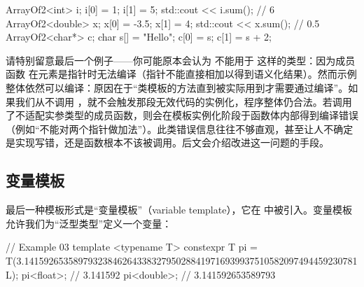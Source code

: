 \begin{code}
ArrayOf2<int> i; 
i[0] = 1; 
i[1] = 5;
std::cout << i.sum();                       // 6
ArrayOf2<double> x; 
x[0] = -3.5; 
x[1] = 4;
std::cout << x.sum();                       // 0.5
ArrayOf2<char*> c; 
char s[] = "Hello";
c[0] = s; 
c[1] = s + 2;
\end{code}

请特别留意最后一个例子——你可能原本会认为  不能用于  这样的类型：因为成员函数  在元素是指针时无法编译（指针不能直接相加以得到语义化结果）。然而示例整体依然可以编译：原因在于“类模板的方法直到被实际用到才需要通过编译”。如果我们从不调用 ，就不会触发那段无效代码的实例化，程序整体仍合法。若调用了不适配实参类型的成员函数，则会在模板实例化阶段于函数体内部得到编译错误（例如“不能对两个指针做加法”）。此类错误信息往往不够直观，甚至让人不确定是实现写错，还是函数根本不该被调用。后文会介绍改进这一问题的手段。

\subsection{变量模板}
最后一种模板形式是“变量模板”（variable template），它在 \cpp[14] 中被引入。变量模板允许我们为“泛型类型”定义一个变量：

\begin{code}
// Example 03
template <typename T>
constexpr T pi = T(3.14159265358979323846264338327950288419716939937510582097494459230781L);
pi<float>;      // 3.141592
pi<double>;     // 3.141592653589793
\end{code}

